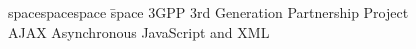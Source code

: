 
\begin{tabbing}
spacespacespace \= space \kill
3GPP	 \> 	3rd Generation Partnership Project	 \\
AJAX	\>	Asynchronous JavaScript and XML \\
\end{tabbing}
\endinput
